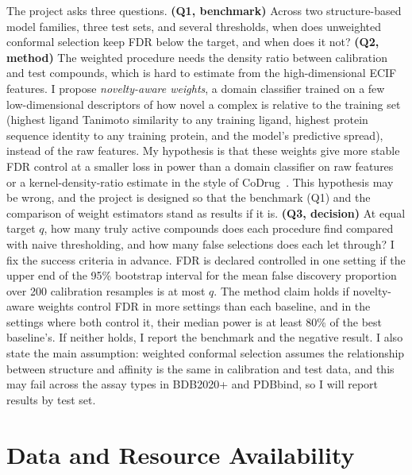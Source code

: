 \documentclass[10pt,twocolumn]{article}
\begin{document}
The project asks three questions. \textbf{(Q1, benchmark)} Across two structure-based model families, three test sets, and several thresholds, when does unweighted conformal selection keep FDR below the target, and when does it not? \textbf{(Q2, method)} The weighted procedure needs the density ratio between calibration and test compounds, which is hard to estimate from the high-dimensional ECIF features. I propose \emph{novelty-aware weights}, a domain classifier trained on a few low-dimensional descriptors of how novel a complex is relative to the training set (highest ligand Tanimoto similarity to any training ligand, highest protein sequence identity to any training protein, and the model's predictive spread), instead of the raw features. My hypothesis is that these weights give more stable FDR control at a smaller loss in power than a domain classifier on raw features or a kernel-density-ratio estimate in the style of CoDrug~\cite{codrug2023}. This hypothesis may be wrong, and the project is designed so that the benchmark (Q1) and the comparison of weight estimators stand as results if it is. \textbf{(Q3, decision)} At equal target $q$, how many truly active compounds does each procedure find compared with naive thresholding, and how many false selections does each let through? I fix the success criteria in advance. FDR is declared controlled in one setting if the upper end of the 95\% bootstrap interval for the mean false discovery proportion over 200 calibration resamples is at most $q$. The method claim holds if novelty-aware weights control FDR in more settings than each baseline, and in the settings where both control it, their median power is at least 80\% of the best baseline's. If neither holds, I report the benchmark and the negative result. I also state the main assumption: weighted conformal selection assumes the relationship between structure and affinity is the same in calibration and test data, and this may fail across the assay types in BDB2020+ and PDBbind, so I will report results by test set.

\section{Data and Resource Availability}
\end{document}
